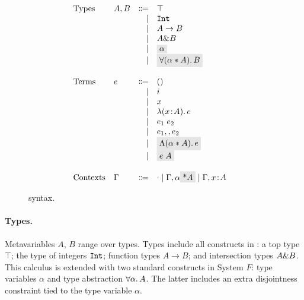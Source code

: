 \begin{figure}
  \[
    \begin{array}{l}
      \begin{array}{llrll}
        \text{Types}
        & A, B & \Coloneqq & \top                        & \\
        &      & \mid & \tyint                           & \\
        &      & \mid & A \to B                          & \\
        &      & \mid & A \inter B                       & \\
        &      & \mid & \highlight{$\alpha$}             & \\
        &      & \mid & \highlight{$\fordis \alpha A B$} & \\

        \\
        \text{Terms}
        & e & \Coloneqq & ()                           & \\
        &   & \mid & i                                 & \\
        &   & \mid & x                                 & \\
        &   & \mid & \lamty x A e                      & \\
        &   & \mid & \app {e_1} {e_2}                  & \\
        &   & \mid & e_1 \mergeop e_2                  & \\
        &   & \mid & \highlight{$\blamdis \alpha A e$} & \\
        &   & \mid & \highlight{$\tapp e A$}           & \\

        \\
        \text{Contexts}
        & \Gamma & \Coloneqq & \cdot
                   \mid \Gamma, \alpha \highlight{\disjoint $A$}
                   \mid \Gamma, x \oftype A  & \\
      \end{array}
    \end{array}
  \]

  \caption{\name syntax.}
  \label{fig:fi-syntax}
\end{figure}

\paragraph{Types.} 
Metavariables $A$, $B$ range over types. 
Types include all constructs in \oldname: a top type $\top$; 
the type of integers $\texttt{Int}$;
function types $A \to B$; and intersection types $A \& B$.
This calculus is extended with two standard constructs in System $F$: 
type variables $\alpha$ and type abstraction $\forall \alpha.\, A$. 
The latter includes an extra disjointness constraint tied to the type 
variable $\alpha$.

